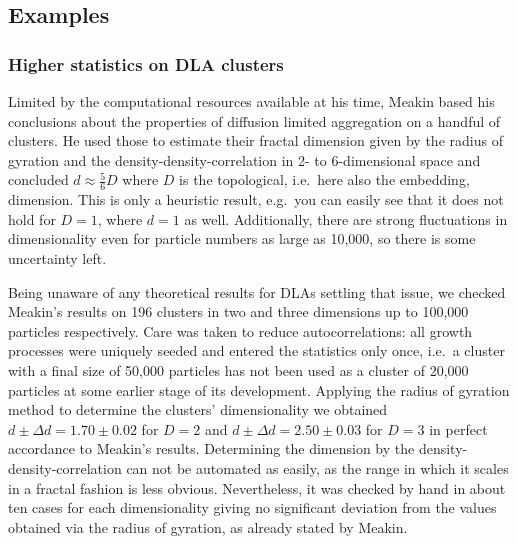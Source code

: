 \documentclass[twocolumn,10pt]{scrartcl}
\begin{document}
        \subsection{Examples}
           \subsubsection{Higher statistics on DLA clusters}
                Limited by the computational resources available at his time, Meakin based his conclusions about
                the properties of diffusion limited aggregation on a handful of clusters. He used those to estimate
                their fractal dimension given by the radius of gyration and the density-density-correlation in
                2- to 6-dimensional space and concluded $d\approx\frac{5}{6}D$ where $D$ is the topological, i.e.\ here
                also the embedding, dimension. This is only a heuristic result, e.g.\ you can easily see that it does
                not hold for $D=1$, where $d=1$ as well. Additionally, there are strong fluctuations in dimensionality
                even for particle numbers as large as 10,000, so there is some uncertainty left.
                
                Being unaware of any
                theoretical results for DLAs settling that issue, we checked Meakin's results on 196 clusters in
                two and three dimensions up to 100,000 particles respectively. Care was taken to reduce
                autocorrelations: all growth
                processes were uniquely seeded and entered the statistics only once, i.e.\ a cluster with a final
                size of 50,000 particles has not been used as a cluster of 20,000 particles at some earlier stage
                of its development. Applying the radius of gyration method to determine the clusters' dimensionality
                we obtained $d\pm\Delta d=1.70\pm0.02$ for $D=2$ and $d\pm\Delta d=2.50\pm0.03$ for $D=3$ in perfect
                accordance to Meakin's results. Determining the dimension by the density-density-correlation can
                not be automated as easily, as the range in which it scales in a fractal fashion is less obvious.
                Nevertheless, it was checked by hand in about ten cases for each dimensionality giving no significant
                deviation from the values obtained via the radius of gyration, as already stated by Meakin.
\end{document}
